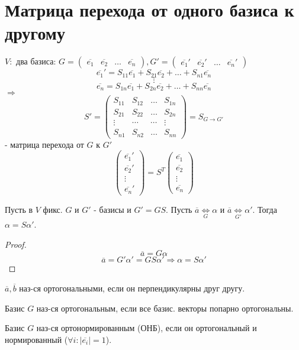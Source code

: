 \section{Матрица перехода от одного базиса к другому}
$V\colon $ два базиса: $G = \begin{pmatrix}\overline{e_1} & \overline{e_2} & \ldots & \overline{e_n} \end{pmatrix}, G' = \begin{pmatrix}\overline{e_1}' & \overline{e_2}' & \ldots & \overline{e_n}' \end{pmatrix}$
\[
    \overline{e_1}' = S_{11} \overline{e_1} + S_{21} \overline{e_2} + \ldots + S_{n1} \overline{e_n}
\] 
\[
\vdots 
\] 
\[
\overline{e_n} = S_{1n} \overline{e_1} + S_{2n} \overline{e_2} + \ldots + S_{nn} \overline{e_n}
\] 
$\Rightarrow$
\[
    S' = \begin{pmatrix}S_{11} & S_{12} & \ldots & S_{1n} \\
    S_{21} & S_{22} & \ldots & S_{2n} \\
\vdots  & \cdots & \cdots  & \vdots \\
S_{n1} & S_{n2} & \ldots & S_{nn}\end{pmatrix} = S_{G \to G'}
\] - матрица перехода от $G$ к $G'$ 
\[
    \begin{pmatrix}\overline{e_1}' \\ \overline{e_2}' \\ \vdots \\ \overline{e_n}' \end{pmatrix} = S^{T} \begin{pmatrix}\overline{e_1} \\ \overline{e_2} \\ \vdots \\ \overline{e_n} \end{pmatrix}
\] 
\begin{statement}
Пусть в $V$ фикс. $G$ и $G'$ - базисы и $G' = GS$. Пусть $\overline{a} \underset{G}{\Longleftrightarrow} \alpha$ и $\overline{a} \underset{G'}{\Longleftrightarrow} \alpha'$. Тогда $\alpha = S \alpha'$.
\end{statement}
\begin{proof}
\[
\overline{a} = G \alpha
\] 
\[
\overline{a} = G' \alpha' = GS \alpha' \Rightarrow \alpha = S\alpha'
\] 
\end{proof}
\begin{definition}
$\overline{a}, \overline{b}$ наз-ся ортогональными, если он перпендикулярны друг другу.
\end{definition}
\begin{definition}
 Базис $G$ наз-ся ортогональным, если все базис. векторы попарно ортогональны.
\end{definition}
\begin{definition}
Базис $G$ наз-ся ортонормированным (ОНБ), если он ортогональный и нормированный ($\forall i \colon |\overline{e_i}| = 1$).
\end{definition}
